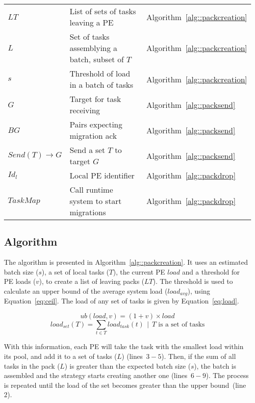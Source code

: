 \begin{table}[t]
{\begin{tabular}{l l l}
		$LT$				& List of sets of tasks leaving a PE					& Algorithm~\ref{alg::packcreation} \\
		$L$				& Set of tasks assemblying a batch, subset of $T$ 	& Algorithm~\ref{alg::packcreation} \\
		$s$			  	& Threshold of load in a batch of tasks 				& Algorithm~\ref{alg::packcreation} \\
		$G$				& Target for task receiving							& Algorithm~\ref{alg::packsend} \\
		$BG$				& Pairs expecting migration ack						& Algorithm~\ref{alg::packsend} \\ 
		$Send(T)\rightarrow G $ & Send a set $T$ to target $G$				& Algorithm~\ref{alg::packsend} \\ 
		$Id_l$ 			& Local PE identifier								& Algorithm~\ref{alg::packdrop} \\
		$TaskMap$		& Call runtime system to start migrations					& Algorithm~\ref{alg::packdrop} \\
		\bottomrule
	\end{tabular}
	}
	\label{tab:algo:symbols}
	\vspace{-10pt}
\end{table}

\subsection{\batchassembly Algorithm} \label{sec:algo:creation}

The \batchassembly algorithm is presented in Algorithm~\ref{alg::packcreation}.
It uses an estimated batch size ($s$), a set of local tasks ($T$), the current PE $load$ and a threshold for PE loads ($v$), to create a list of leaving packs ($LT$).
The threshold is used to calculate an upper bound of the average system load ($load_{avg}$), using Equation~\ref{eq:ceil}. 
The load of any set of tasks is given by Equation~\ref{eq:load}.

\begin{equation}
	ub(load,v) = (1+v)\times load
    \label{eq:ceil}
\end{equation}
\begin{equation}
	load_{set}(T) = \sum_{t \in T}{load_{task}(t)}\ \ |\ \ T \text{ is a set of tasks}
	\label{eq:load}
\end{equation}

With this information, each PE will take the task with the smallest load within its pool, and add it to a set of tasks ($L$) (lines~$3-5$).
Then, if the sum of all tasks in the pack ($L$) is greater than the expected batch size ($s$), the batch is assembled and the strategy starts creating another one (lines~$6-9$).
The process is repeated until the load of the set becomes greater than the upper bound~(line~$2$).

